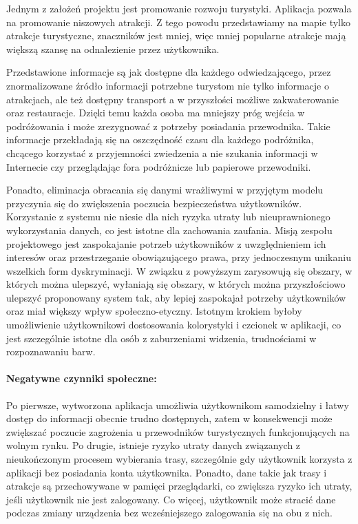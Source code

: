 \indent Jednym z założeń projektu jest promowanie rozwoju turystyki. Aplikacja pozwala na promowanie niszowych atrakcji.
Z tego powodu przedstawiamy na mapie tylko atrakcje turystyczne, znaczników jest mniej, więc mniej popularne atrakcje mają większą szansę na odnalezienie przez użytkownika.

\indent Przedstawione informacje są jak dostępne dla każdego odwiedzającego, przez znormalizowane źródło informacji potrzebne turystom nie tylko informacje o atrakcjach, ale też dostępny transport a w przyszłości  możliwe zakwaterowanie oraz restauracje.
Dzięki temu każda osoba ma mniejszy próg wejścia w podróżowania i może zrezygnować z potrzeby posiadania przewodnika.
Takie informacje przekładają się na oszczędność czasu dla każdego podróżnika, chcącego korzystać z przyjemności zwiedzenia a nie szukania informacji w Internecie czy przeglądając fora podróżnicze lub papierowe przewodniki.


\indent Ponadto, eliminacja obracania się danymi wrażliwymi w przyjętym modelu przyczynia się do zwiększenia poczucia bezpieczeństwa użytkowników. Korzystanie z systemu nie niesie dla nich ryzyka utraty lub nieuprawnionego wykorzystania danych, co jest istotne dla zachowania zaufania. Misją zespołu projektowego jest zaspokajanie potrzeb użytkowników z uwzględnieniem ich interesów oraz przestrzeganie obowiązującego prawa, przy jednoczesnym unikaniu wszelkich form dyskryminacji.
W związku z powyższym zarysowują się obszary, w których można ulepszyć, wyłaniają się obszary, w których można przyszłościowo ulepszyć proponowany system tak, aby lepiej zaspokajał potrzeby użytkowników oraz miał większy wpływ społeczno-etyczny. Istotnym krokiem byłoby umożliwienie użytkownikowi dostosowania kolorystyki i czcionek w aplikacji, co jest szczególnie istotne dla osób z zaburzeniami widzenia, trudnościami w rozpoznawaniu barw.

\paragraph*{Negatywne czynniki społeczne:}
\sloppy
\indent Po pierwsze, wytworzona aplikacja umożliwia użytkownikom samodzielny i łatwy dostęp do informacji obecnie trudno dostępnych, zatem w konsekwencji 
może zwiększać poczucie zagrożenia u przewodników turystycznych funkcjonujących na wolnym rynku. 
\newline
\indent Po drugie, istnieje ryzyko utraty danych związanych z nieukończonym procesem wybierania trasy, szczególnie gdy użytkownik korzysta z aplikacji bez posiadania konta użytkownika. Ponadto, dane takie jak trasy i atrakcje są przechowywane w pamięci przeglądarki, co zwiększa ryzyko ich utraty, jeśli użytkownik nie jest zalogowany. Co więcej, użytkownik może stracić dane podczas zmiany urządzenia bez wcześniejszego zalogowania się na obu z nich.\newline 

